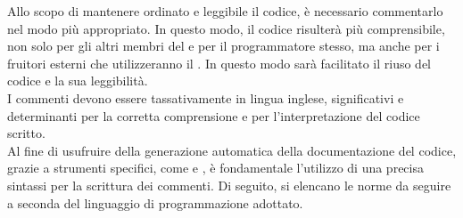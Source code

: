 			 \label{sec:NormeCommenti}
			Allo scopo di mantenere ordinato e leggibile il codice, è necessario commentarlo nel modo più appropriato. In questo modo, il codice risulterà più comprensibile, non solo per gli altri membri del  e per il programmatore stesso, ma anche per i fruitori esterni che utilizzeranno il . In questo modo sarà facilitato il riuso del codice e la sua leggibilità. \\
			I commenti devono essere tassativamente in lingua inglese, significativi e determinanti per la corretta comprensione e per l'interpretazione del codice scritto.\\
			Al fine di usufruire della generazione automatica della documentazione del codice, grazie a strumenti specifici, come  e , è fondamentale l'utilizzo di una precisa sintassi per la scrittura dei commenti.
			Di seguito, si elencano le norme da seguire a seconda del linguaggio di programmazione adottato.
